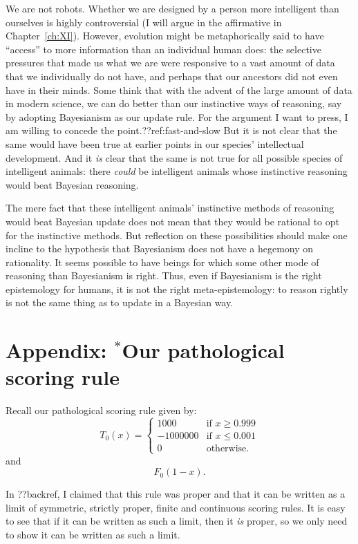 We are not robots. Whether we are designed by a person more intelligent than ourselves is highly controversial (I will 
argue in the affirmative in Chapter~\ref{ch:XI}). However, evolution might be metaphorically said to have ``access'' to more 
information than an individual human does: the selective pressures that made us what we are were responsive to a vast amount
of data that we individually do not have, and perhaps that our ancestors did not even have in their minds. Some think 
that with the advent of the large amount of data in modern science, we can do 
better than our instinctive ways of reasoning, say by adopting Bayesianism as our update rule. For the argument I want 
to press, I am willing to concede the point.??ref:fast-and-slow But it is not clear that the same would have been true at earlier points in our species' intellectual development. And it \textit{is} clear that the same is not true for all possible species 
of intelligent animals: there \textit{could} be intelligent animals whose instinctive reasoning would beat Bayesian
reasoning. 

The mere fact that these intelligent animals' instinctive methods of reasoning would beat Bayesian update does not mean that they would be rational to opt for the instinctive methods. But reflection on these possibilities should make one incline to 
the hypothesis that Bayesianism does not have a hegemony on rationality. It seems possible to have beings for which some
other mode of reasoning than Bayesianism is right. Thus, even if Bayesianism is the right epistemology for humans,
it is not the right meta-epistemology: to reason rightly is not the same thing as to update in a Bayesian way. 


\section*{Appendix: $^*$Our pathological scoring rule}
Recall our pathological scoring rule given by:
$$
	T_0(x) = \begin{cases} 1000 &\text{if }x\ge 0.999\\
						-1000000 &\text{if }x\le 0.001\\
						0 &\text{otherwise}.
						\end{cases}
$$
and
$$
	F_0(1-x).
$$

In ??backref, I claimed that this rule was proper and that it can be written as a limit of
symmetric, strictly proper, finite and continuous scoring rules. It is easy to see that if it
can be written as such a limit, then it \textit{is} proper, so we only need to show it can be
written as such a limit.

